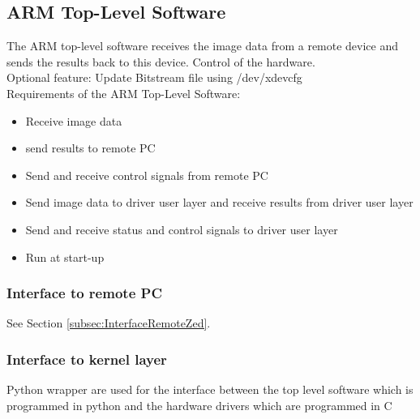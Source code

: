 \subsection{ARM Top-Level Software}
The ARM top-level software receives the image data from a remote device and sends the results back to this device. Control of the hardware. \\
Optional feature: Update Bitstream file using /dev/xdevcfg \\
Requirements of the ARM Top-Level Software:
\begin{itemize} 
	\item Receive image data
	\item send results to remote PC
	\item Send and receive control signals from remote PC
	\item Send image data to driver user layer and receive results from driver user layer
	\item Send and receive status and control signals to driver user layer
	\item Run at start-up 
\end{itemize}

\subsubsection{Interface to remote PC}
See Section \ref{subsec:InterfaceRemoteZed}.  
\subsubsection{Interface to kernel layer}
Python wrapper are used for the interface between the top level software which is programmed in python and the hardware drivers which are programmed in C

